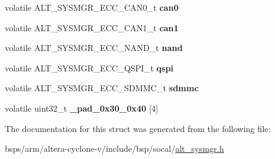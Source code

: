 \begin{DoxyCompactItemize}
\item 
\mbox{\label{structALT__SYSMGR__ECC__s_a40c445b4426d576c36589b64cdeaeed2}} 
volatile A\+L\+T\+\_\+\+S\+Y\+S\+M\+G\+R\+\_\+\+E\+C\+C\+\_\+\+C\+A\+N0\+\_\+t {\bfseries can0}
\item 
\mbox{\label{structALT__SYSMGR__ECC__s_ae5334eae7eb697efc1e6a9d9fe310cea}} 
volatile A\+L\+T\+\_\+\+S\+Y\+S\+M\+G\+R\+\_\+\+E\+C\+C\+\_\+\+C\+A\+N1\+\_\+t {\bfseries can1}
\item 
\mbox{\label{structALT__SYSMGR__ECC__s_ab6e95b81560ba5f57a38ddacd63be2b7}} 
volatile A\+L\+T\+\_\+\+S\+Y\+S\+M\+G\+R\+\_\+\+E\+C\+C\+\_\+\+N\+A\+N\+D\+\_\+t {\bfseries nand}
\item 
\mbox{\label{structALT__SYSMGR__ECC__s_a6b4fdcb1b770959664cd746aefed4b41}} 
volatile A\+L\+T\+\_\+\+S\+Y\+S\+M\+G\+R\+\_\+\+E\+C\+C\+\_\+\+Q\+S\+P\+I\+\_\+t {\bfseries qspi}
\item 
\mbox{\label{structALT__SYSMGR__ECC__s_a91ec8fb953a89ced496f946e63fb2502}} 
volatile A\+L\+T\+\_\+\+S\+Y\+S\+M\+G\+R\+\_\+\+E\+C\+C\+\_\+\+S\+D\+M\+M\+C\+\_\+t {\bfseries sdmmc}
\item 
\mbox{\label{structALT__SYSMGR__ECC__s_a2f8894334dfe0afc9e7f7e2dd3b76658}} 
volatile uint32\+\_\+t {\bfseries \+\_\+pad\+\_\+0x30\+\_\+0x40} \mbox{[}4\mbox{]}
\end{DoxyCompactItemize}


The documentation for this struct was generated from the following file\+:\begin{DoxyCompactItemize}
\item 
bsps/arm/altera-\/cyclone-\/v/include/bsp/socal/\mbox{\hyperlink{alt__sysmgr_8h}{alt\+\_\+sysmgr.\+h}}\end{DoxyCompactItemize}
